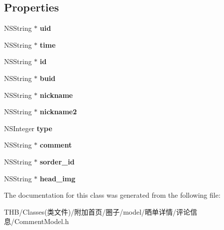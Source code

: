 \subsection*{Properties}
\begin{DoxyCompactItemize}
\item 
\mbox{\label{interface_comment_model_a65c61655d24844d6fdd2da5d66131299}} 
N\+S\+String $\ast$ {\bfseries uid}
\item 
\mbox{\label{interface_comment_model_a304bde512a8525fb4ff7b88a95904148}} 
N\+S\+String $\ast$ {\bfseries time}
\item 
\mbox{\label{interface_comment_model_a9eabd7cc8c60aa0becfe2a9ee8f29c3e}} 
N\+S\+String $\ast$ {\bfseries id}
\item 
\mbox{\label{interface_comment_model_a73edd07695ac1e3fd59dd4107f01b835}} 
N\+S\+String $\ast$ {\bfseries buid}
\item 
\mbox{\label{interface_comment_model_a00df8738ffc411d325ae684b8fa0afb3}} 
N\+S\+String $\ast$ {\bfseries nickname}
\item 
\mbox{\label{interface_comment_model_a242e377e2e22015f17ac8d6a8b11eb08}} 
N\+S\+String $\ast$ {\bfseries nickname2}
\item 
\mbox{\label{interface_comment_model_a4dd7b8b2617dcac0804ab2ae2bde4919}} 
N\+S\+Integer {\bfseries type}
\item 
\mbox{\label{interface_comment_model_a33dfe29db1d26d021e3c913d2c573fe5}} 
N\+S\+String $\ast$ {\bfseries comment}
\item 
\mbox{\label{interface_comment_model_add0042b10adff55123aef016a7bc450a}} 
N\+S\+String $\ast$ {\bfseries sorder\+\_\+id}
\item 
\mbox{\label{interface_comment_model_acb70129c37482e14cc09e335b2779891}} 
N\+S\+String $\ast$ {\bfseries head\+\_\+img}
\end{DoxyCompactItemize}


The documentation for this class was generated from the following file\+:\begin{DoxyCompactItemize}
\item 
T\+H\+B/\+Classes(类文件)/附加首页/圈子/model/晒单详情/评论信息/Comment\+Model.\+h\end{DoxyCompactItemize}
